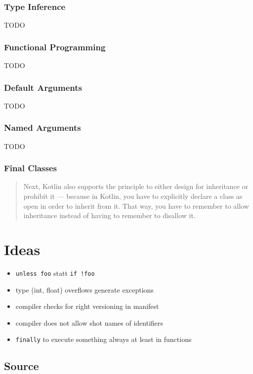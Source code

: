 \documentclass[a4paper,12pt]{article}
\begin{document}
\subsubsection{Type Inference}
TODO

\subsubsection{Functional Programming}
TODO

\subsubsection{Default Arguments}
TODO

\subsubsection{Named Arguments}
TODO

\subsubsection{Final Classes}

\begin{quotation}
Next, Kotlin also supports the principle to either design for inheritance or prohibit it — because in Kotlin, you have to explicitly declare a class as open in order to inherit from it. That way, you have to remember to allow inheritance instead of having to remember to disallow it.\cite{kotlin-sommerhoff}
\end{quotation}

\section{Ideas}

\begin{itemize}
	\item \texttt{unless foo} statt \texttt{if !foo}
	\item type (int, float) overflows generate exceptions
	\item compiler checks for right versioning in manifest
	\item compiler does not allow shot names of identifiers
	\item \texttt{finally} to execute something always at least in functions
\end{itemize}

\subsection{Source}
\end{document}
